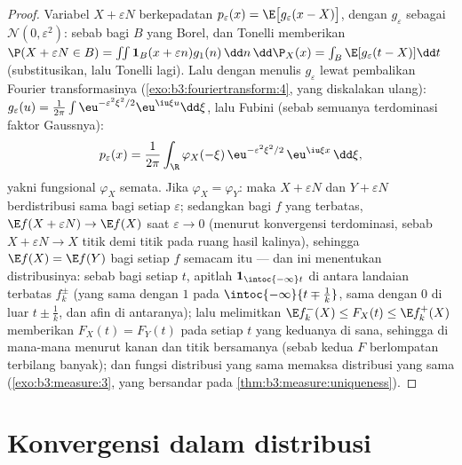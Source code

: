 \begin{proof}
Variabel $X + \varepsilon N$ berkepadatan $p_\varepsilon(x) =
\E\bigl[g_\varepsilon(x - X)\bigr]$, dengan $g_\varepsilon$ sebagai
 $\mathcal N(0, \varepsilon^2)$: sebab bagi $B$ yang
Borel,  dan Tonelli memberikan $\P(X + \varepsilon N \in
B) = \int\!\!\int\mathbf 1_B(x + \varepsilon
n)g_1(n)\,\dd n\,\dd\P_X(x) = \int_B\E[g_\varepsilon(t -
X)]\dd t$ (substitusikan, lalu Tonelli lagi). Lalu dengan menulis
$g_\varepsilon$ lewat pembalikan Fourier transformasinya
(\cref{exo:b3:fouriertransform:4}, yang diskalakan ulang):
$g_\varepsilon(u) = \frac1{2\pi}\int
\eu^{-\varepsilon^2\xi^2/2}\eu^{\iu\xi u}\dd\xi$, lalu Fubini
(sebab semuanya terdominasi faktor Gaussnya):
\[
p_\varepsilon(x) = \frac1{2\pi}\int_\R
\varphi_X(-\xi)\,\eu^{-\varepsilon^2\xi^2/2}\,
\eu^{\iu\xi x}\,\dd\xi ,
\]
yakni fungsional $\varphi_X$ semata. Jika $\varphi_X =
\varphi_Y$: maka $X + \varepsilon N$ dan $Y + \varepsilon N$
berdistribusi sama bagi setiap $\varepsilon$; sedangkan bagi $f$ yang
 terbatas, $\E f(X + \varepsilon N) \to \E f(X)$ saat $\varepsilon
\to 0$ (menurut konvergensi terdominasi, sebab $X + \varepsilon N \to X$
titik demi titik pada ruang hasil kalinya), sehingga $\E f(X) = \E f(Y)$ bagi
setiap $f$ semacam itu --- dan ini menentukan distribusinya: sebab bagi setiap $t$,
apitlah $\mathbf 1_{\intoc{-\infty}t}$ di antara landaian
 terbatas $f_k^\pm$ (yang sama dengan $1$ pada
$\intoc{-\infty}{t \mp \frac1k}$, sama dengan $0$ di luar $t \pm
\frac1k$, dan afin di antaranya); lalu melimitkan $\E
f_k^-(X) \leq F_X(t) \leq \E f_k^+(X)$ memberikan $F_X(t) =
F_Y(t)$ pada setiap $t$ yang keduanya  di sana, sehingga
di mana-mana menurut  kanan dan  titik
 bersamanya (sebab kedua $F$ berlompatan terbilang banyak);
dan fungsi distribusi yang sama memaksa distribusi yang sama
(\cref{exo:b3:measure:3}, yang bersandar pada
\cref{thm:b3:measure:uniqueness}).
\end{proof}

\section{Konvergensi dalam distribusi}

